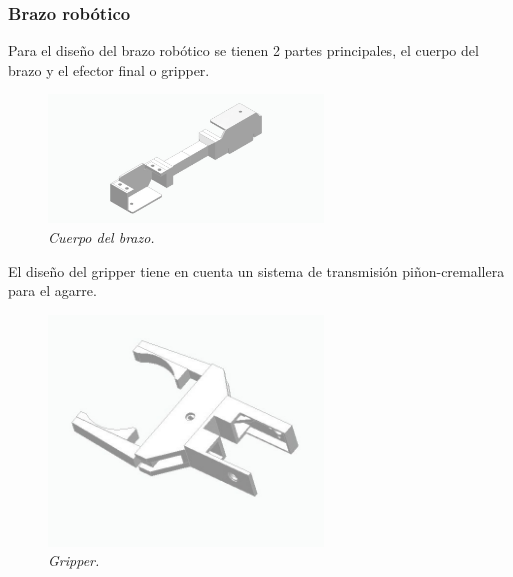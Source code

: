 \subsubsection{Brazo robótico}
Para el diseño del brazo robótico se tienen 2 partes principales, el cuerpo del brazo y el efector final o gripper. \\
\begin{figure}[H]
    \centering
\includegraphics[width=0.65\textwidth]{img/brazo_medio.jpg} \par
    \caption{\textit{Cuerpo del brazo.}}
    \label{fig:brazo}
\end{figure}
El diseño del gripper tiene en cuenta un sistema de transmisión piñon-cremallera para el agarre. 
\begin{figure}[H]
    \centering
\includegraphics[width=0.65\textwidth]{img/pinza.jpg} \par
    \caption{\textit{Gripper.}}
    \label{fig:gripper}
\end{figure}


